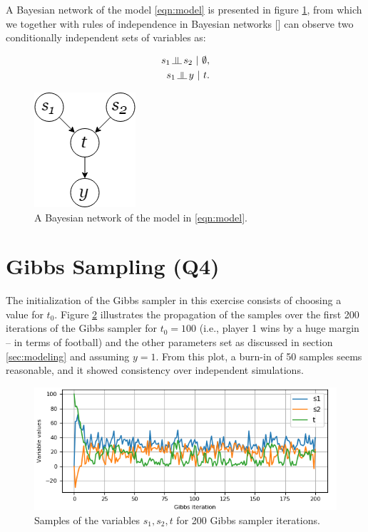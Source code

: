 \documentclass{article}
\newcommand{\indep}{\rotatebox[origin=c]{90}{$\models$}}
\begin{document}
	A Bayesian network of the model \eqref{eqn:model} is presented in figure \ref{fig:bayes_n}, from which we together with rules of independence in Bayesian networks [\cite{asdf1337}] can observe two conditionally independent sets of variables as:
	
	\begin{align}
		s_1 \,\indep \, s_2 ~|~ \emptyset, \\
		s_1 \,\indep \, y ~|~ t.
	\end{align}
	
	\begin{figure}[t]
		\centering
		\includegraphics[width=0.2\linewidth]{bayes4}
		\caption{A Bayesian network of the model in \eqref{eqn:model}.}
		\label{fig:bayes_n}
	\end{figure}
	
	\section{Gibbs Sampling (Q4)}
	The initialization of the Gibbs sampler in this exercise consists of choosing a value for $t_0$. Figure \ref{fig:q_4_1} illustrates the propagation of the samples over the first 200 iterations of the Gibbs sampler for $t_0=100$ (i.e., player 1 wins by a huge margin -- in terms of football) and the other parameters set as discussed in section \ref{sec:modeling} and assuming $y=1$. From this plot, a burn-in of 50 samples seems reasonable, and it showed consistency over independent simulations.
	\begin{figure}[t]
		\centering
		\includegraphics[width=.7\linewidth]{q_4_1}
		\caption{Samples of the variables $ s_1,s_2,t $ for 200 Gibbs sampler iterations.}  
		\label{fig:q_4_1}
	\end{figure}
\end{document}

